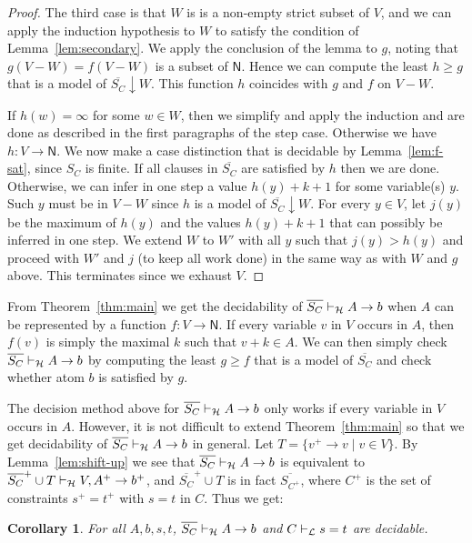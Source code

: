 \documentclass[11pt,a4paper]{article}
\newtheorem{corollary}[theorem]{Corollary}
\newcommand{\N}{\mathsf{N}}
\newcommand\set[1]{\{#1\}}
\newcommand\lathy{{\cal L}}
\newcommand\prvL{\vdash_{\lathy}}
\newcommand\prvH{\vdash_{\cal H}}
\newcommand\upS[1]{\overline{S_{#1}}}
\begin{document}
\begin{proof}
The third case is that $W$ is is a non-empty strict 
subset of $V$, and we can apply the induction
hypothesis to $W$ to satisfy the condition of 
Lemma~\ref{lem:secondary}. We apply the conclusion of 
the lemma to $g$, noting that $g(V-W)=f(V-W)$ is
a subset of $\N$. Hence we can compute the least 
$h\geq g$ that is a model of $\upS{C}{\downarrow}W$.
This function $h$ coincides with $g$ and $f$ on $V-W$. 

If $h(w) = \infty$ for some $w\in W$, 
then we simplify and apply the induction and are done 
as described in the first paragraphs of the step case.
Otherwise we have $h: V\to\N$.
We now make a case distinction that is decidable by 
Lemma~\ref{lem:f-sat}, since $S_C$ is finite.
If all clauses in $\upS{C}$ are satisfied by $h$ then we are done.
Otherwise, we can infer in one step a value $h(y)+k+1$ 
for some variable(s) $y$. Such $y$ must be in $V-W$ 
since $h$ is a model of $\upS{C}{\downarrow}W$.
For every $y\in V$, let $j(y)$ be the maximum of $h(y)$
and the values $h(y)+k+1$ that can possibly
be inferred in one step.
We extend $W$ to $W'$ with all $y$ such that $j(y)>h(y)$ 
and proceed with $W'$ and $j$ (to keep all work done)
in the same way as with $W$ and $g$ above.
This terminates since we exhaust $V$.
\end{proof}


From Theorem~\ref{thm:main} we get the decidability of $\upS{C}\prvH A\to b$
when $A$ can be represented by a function $f: V\to\N$. If every
variable $v$ in $V$ occurs in $A$, then $f(v)$ is simply
the maximal $k$ such that $v+k \in A$. We can then simply check
$\upS{C}\prvH A\to b$ by computing the least $g\geq f$ that is
a model of $\upS{C}$ and check whether atom $b$ is satisfied by $g$.

The decision method above for $\upS{C}\prvH A\to b$ only works
if every variable in $V$ occurs in $A$.
However, it is not difficult to extend Theorem~\ref{thm:main}
so that we get decidability of $\upS{C}\prvH A\to b$ in general. 
Let $T=\set{v^+\to v \mid v\in V}$. By Lemma~\ref{lem:shift-up}
we see that $\upS{C}\prvH A\to b$ is equivalent to
$\upS{C}^+ \cup T \prvH V,A^+ \to b^+$, and
$\upS{C}^+ \cup T$ is in fact $\upS{C^+}$, where
$C^+$ is the set of constraints $s^+ = t^+$ with $s=t$ in $C$.
 Thus we get:

\begin{corollary}\label{cor:decidability}
For all $A,b,s,t$, $\upS{C}\prvH A\to b$ and $C\prvL s=t$ are decidable.
\end{corollary}
\end{document}
